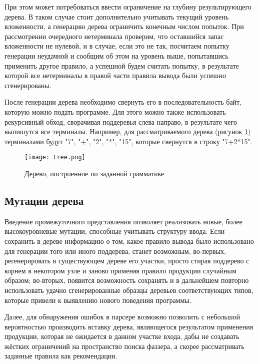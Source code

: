 При этом может потребоваться ввести ограничение на глубину результирующего дерева. В таком случае стоит дополнительно учитывать текущий уровень вложенности, а генерацию дерева ограничить конечным числом попыток. При рассмотрении очередного нетерминала проверим, что оставшийся запас вложенности не нулевой, и в случае, если это не так, посчитаем попытку генерации неудачной и сообщим об этом на уровень выше, попытавшись применить другое правило, а успешной будем считать попытку, в результате которой все нетерминалы в правой части правила вывода были успешно сгенерированы.

После генерации дерева необходимо свернуть его в последовательность байт, которую можно подать программе. Для этого можно также использовать рекурсивный обход, сворачивая поддеревья слева направо, в результате чего выпишутся все терминалы. Например, для рассматриваемого дерева (рисунок \ref{fig:tree_folding}) терминалами будут "7", "+", "2", "*", "15", которые свернутся в строку "7+2*15".

\begin{figure}[h]
	\centering
	\texttt{[image: tree.png]}
	\caption{Дерево, построенное по заданной грамматике}
	\label{fig:tree_folding}
\end{figure}%

\subsection{Мутации дерева}

Введение промежуточного представления позволяет реализовать новые, более высокоуровневые мутации, способные учитывать структуру ввода. Если сохранить в дереве информацию о том, какое правило вывода было использовано для генерации того или иного поддерева, станет возможным, во-первых, регенерировать в существующем дереве его участки, просто стирая поддерево с корнем в некотором узле и заново применяя правило продукции случайным образом; во-вторых, появится возможность сохранять и в дальнейшем повторно использовать удачно сгенерированные образцы деревьев соответствующих типов, которые привели к выявлению нового поведения программы.

Далее, для обнаружения ошибок в парсере возможно позволить с небольшой вероятностью производить вставку дерева, являющегося результатом применения продукции, которая не ожидается в данном участке входа, дабы не создавать жёстких ограничений на пространство поиска фаззера, а скорее рассматривать заданные правила как рекомендации.

